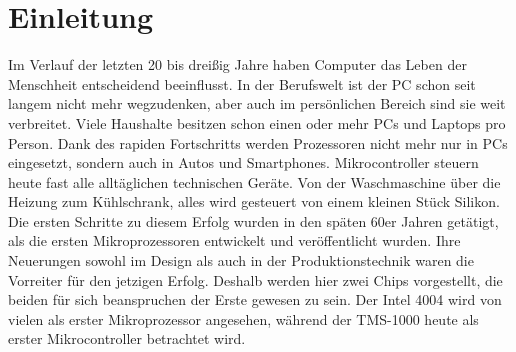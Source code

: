\chapter{Einleitung}
Im Verlauf der letzten 20 bis dreißig Jahre haben Computer das Leben der Menschheit entscheidend beeinflusst. In der Berufswelt ist der PC schon seit langem nicht mehr wegzudenken, aber auch im persönlichen Bereich sind sie weit verbreitet. Viele Haushalte besitzen schon einen oder mehr PCs und Laptops pro Person. Dank des rapiden Fortschritts werden Prozessoren nicht mehr nur in PCs eingesetzt, sondern auch in Autos und Smartphones. Mikrocontroller steuern heute fast alle alltäglichen technischen Geräte. Von der Waschmaschine über die Heizung zum Kühlschrank, alles wird gesteuert von einem kleinen Stück Silikon. Die ersten Schritte zu diesem Erfolg wurden in den späten 60er Jahren getätigt, als die ersten Mikroprozessoren entwickelt und veröffentlicht wurden. Ihre Neuerungen sowohl im Design als auch in der Produktionstechnik waren die Vorreiter für den jetzigen Erfolg. Deshalb werden hier zwei Chips vorgestellt, die beiden für sich beanspruchen der Erste gewesen zu sein. Der Intel 4004 wird von vielen als erster Mikroprozessor angesehen, während der TMS-1000 heute als erster Mikrocontroller betrachtet wird.